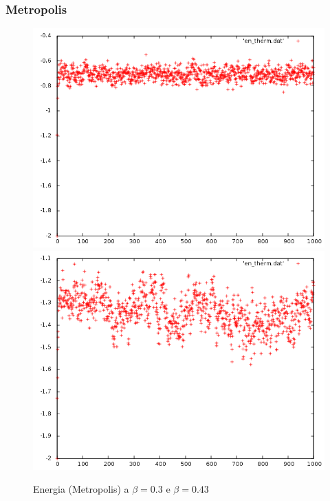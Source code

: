 \subsubsection*{Metropolis}
\begin{figure}[h]
\includegraphics[scale=0.35]{metropolis/en_therm.png}
\includegraphics[scale=0.35]{metropolis/en_therm_crit.png}
\caption{Energia (Metropolis) a $\beta=0.3$ e $\beta=0.43$}
\end{figure}
